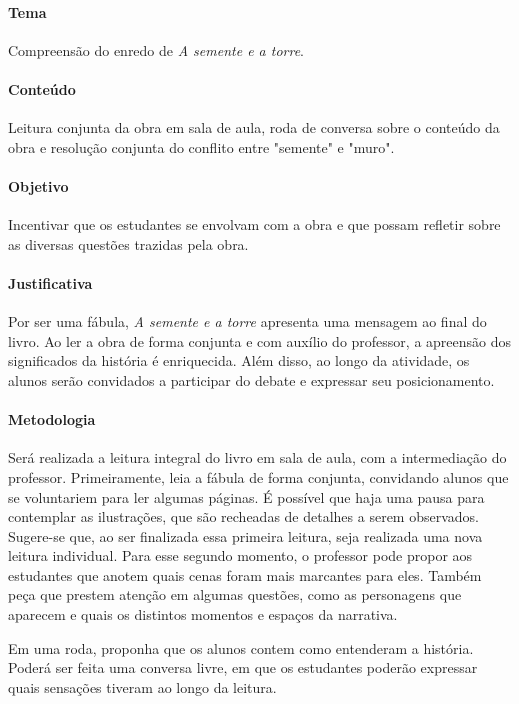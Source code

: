 \documentclass[11pt]{extarticle}
\begin{document}
\paragraph{Tema} Compreensão do enredo de \textit{A semente e a torre}.

\paragraph{Conteúdo} Leitura conjunta da obra em sala de aula, roda de conversa sobre o conteúdo da obra e resolução conjunta do conflito entre "semente" e "muro".

\paragraph{Objetivo} Incentivar que os estudantes se envolvam com a obra e que possam refletir sobre as diversas questões trazidas pela obra.

\paragraph{Justificativa} Por ser uma fábula, \textit{A semente e a torre} apresenta uma mensagem ao final do livro. Ao ler a obra de forma conjunta e com auxílio do professor, a apreensão dos significados da história é enriquecida. Além disso, ao longo da atividade, os alunos serão convidados a participar do debate e expressar seu posicionamento.

\paragraph{Metodologia} Será realizada a leitura integral do livro em sala de aula, com a intermediação do professor. Primeiramente, leia a fábula de forma conjunta, convidando alunos que se voluntariem para ler algumas páginas. É possível que haja uma pausa para contemplar as ilustrações, que são recheadas de detalhes a serem observados. Sugere-se que, ao ser finalizada essa primeira leitura, seja realizada uma nova leitura individual. Para esse segundo momento, o professor pode propor aos estudantes que anotem quais cenas foram mais marcantes para eles. Também peça que prestem atenção em algumas questões, como as personagens que aparecem e quais os distintos momentos e espaços da narrativa.

Em uma roda, proponha que os alunos contem como entenderam a história. Poderá ser feita uma conversa livre, em que os estudantes poderão expressar quais sensações tiveram ao longo da leitura. 
\end{document}
